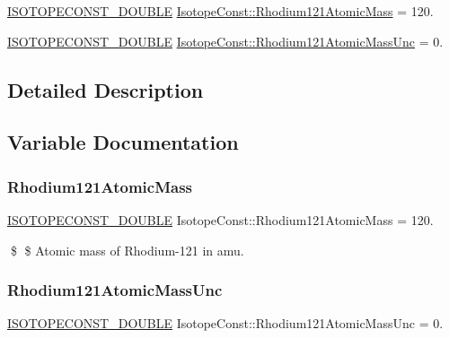 \begin{DoxyCompactItemize}
\item 
\mbox{\hyperlink{group___isotope_const-_macros_ga8f45a7272ce02c0b4c65c44636ed719a}{I\+S\+O\+T\+O\+P\+E\+C\+O\+N\+S\+T\+\_\+\+D\+O\+U\+B\+LE}} \mbox{\hyperlink{group___isotope_const-_rhodium-_rh121_gaefde532e2528156069099da32acbb3be}{Isotope\+Const\+::\+Rhodium121\+Atomic\+Mass}} = 120.
\item 
\mbox{\hyperlink{group___isotope_const-_macros_ga8f45a7272ce02c0b4c65c44636ed719a}{I\+S\+O\+T\+O\+P\+E\+C\+O\+N\+S\+T\+\_\+\+D\+O\+U\+B\+LE}} \mbox{\hyperlink{group___isotope_const-_rhodium-_rh121_ga168f76eb1a63398b23b8394daca0a394}{Isotope\+Const\+::\+Rhodium121\+Atomic\+Mass\+Unc}} = 0.
\end{DoxyCompactItemize}


\subsection{Detailed Description}


\subsection{Variable Documentation}
\mbox{\label{group___isotope_const-_rhodium-_rh121_gaefde532e2528156069099da32acbb3be}} 
\subsubsection{\texorpdfstring{Rhodium121\+Atomic\+Mass}{Rhodium121AtomicMass}}
{\footnotesize\ttfamily \mbox{\hyperlink{group___isotope_const-_macros_ga8f45a7272ce02c0b4c65c44636ed719a}{I\+S\+O\+T\+O\+P\+E\+C\+O\+N\+S\+T\+\_\+\+D\+O\+U\+B\+LE}} Isotope\+Const\+::\+Rhodium121\+Atomic\+Mass = 120.}

\$ \$ Atomic mass of Rhodium-\/121 in amu. \mbox{\label{group___isotope_const-_rhodium-_rh121_ga168f76eb1a63398b23b8394daca0a394}} 
\subsubsection{\texorpdfstring{Rhodium121\+Atomic\+Mass\+Unc}{Rhodium121AtomicMassUnc}}
{\footnotesize\ttfamily \mbox{\hyperlink{group___isotope_const-_macros_ga8f45a7272ce02c0b4c65c44636ed719a}{I\+S\+O\+T\+O\+P\+E\+C\+O\+N\+S\+T\+\_\+\+D\+O\+U\+B\+LE}} Isotope\+Const\+::\+Rhodium121\+Atomic\+Mass\+Unc = 0.}

